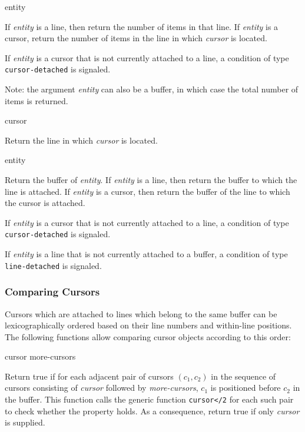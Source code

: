  {entity}

If \textit{entity} is a line, then return the number of items in that
line.  If \textit{entity} is a cursor, return the number of items in
the line in which \textit{cursor} is located.

If \textit{entity} is a cursor that is not currently attached to a
line, a condition of type \texttt{cursor-detached} is signaled.

Note: the argument \textit{entity} can also be a buffer, in which case
the total number of items is returned.

 {cursor}

Return the line in which \textit{cursor} is located.

\ifdetached{}

 {entity}

Return the buffer of \textit{entity}.  If \textit{entity} is a line,
then return the buffer to which the line is attached.  If
\textit{entity} is a cursor, then return the buffer of the line to
which the cursor is attached.

If \textit{entity} is a cursor that is not currently attached to a
line, a condition of type \texttt{cursor-detached} is signaled.

If \textit{entity} is a line that is not currently attached to a
buffer, a condition of type \texttt{line-detached} is signaled.

\subsubsection{Comparing Cursors}

Cursors which are attached to lines which belong to the same buffer
can be lexicographically ordered based on their line numbers and
within-line positions.  The following functions allow comparing cursor
objects according to this order:

 {cursor \rest more-cursors}

Return true if for each adjacent pair of cursors $(c_1, c_2)$ in the
sequence of cursors consisting of \textit{cursor} followed by
\textit{more-cursors}, $c_1$ is positioned before $c_2$ in the buffer.
This function calls the generic function \texttt{cursor</2} for each
such pair to check whether the property holds.  As a consequence,
return true if only \textit{cursor} is supplied.

\ifdetachedmany{}

